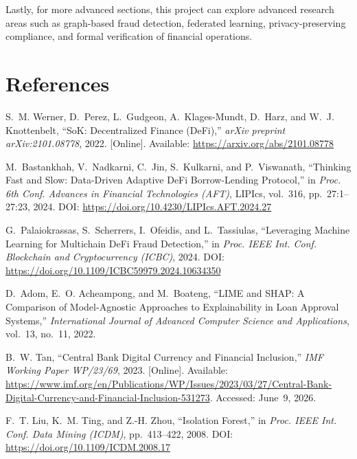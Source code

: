 \documentclass[12pt, a4paper]{report}
\begin{document}
Lastly, for more advanced sections, this project can explore advanced research areas such as graph-based fraud detection, federated learning, privacy-preserving compliance, and formal verification of financial operations.

\chapter*{References}
{}

{\small
\begin{enumerate}[label={[\arabic*]}]
\item S.~M. Werner, D.~Perez, L.~Gudgeon, A.~Klages-Mundt, D.~Harz, and W.~J. Knottenbelt, ``SoK: Decentralized Finance (DeFi),'' \textit{arXiv preprint arXiv:2101.08778}, 2022. [Online]. Available: \url{https://arxiv.org/abs/2101.08778}

\item M.~Bastankhah, V.~Nadkarni, C.~Jin, S.~Kulkarni, and P.~Viswanath, ``Thinking Fast and Slow: Data-Driven Adaptive DeFi Borrow-Lending Protocol,'' in \textit{Proc. 6th Conf. Advances in Financial Technologies (AFT)}, LIPIcs, vol.~316, pp.~27:1--27:23, 2024. DOI: \url{https://doi.org/10.4230/LIPIcs.AFT.2024.27}

\item G.~Palaiokrassas, S.~Scherrers, I.~Ofeidis, and L.~Tassiulas, ``Leveraging Machine Learning for Multichain DeFi Fraud Detection,'' in \textit{Proc. IEEE Int. Conf. Blockchain and Cryptocurrency (ICBC)}, 2024. DOI: \url{https://doi.org/10.1109/ICBC59979.2024.10634350}

\item D.~Adom, E.~O. Acheampong, and M.~Boateng, ``LIME and SHAP: A Comparison of Model-Agnostic Approaches to Explainability in Loan Approval Systems,'' \textit{International Journal of Advanced Computer Science and Applications}, vol.~13, no.~11, 2022.

\item B.~W. Tan, ``Central Bank Digital Currency and Financial Inclusion,'' \textit{IMF Working Paper WP/23/69}, 2023. [Online]. Available: \url{https://www.imf.org/en/Publications/WP/Issues/2023/03/27/Central-Bank-Digital-Currency-and-Financial-Inclusion-531273}. Accessed: June~9, 2026.

\item F.~T. Liu, K.~M. Ting, and Z.-H. Zhou, ``Isolation Forest,'' in \textit{Proc. IEEE Int. Conf. Data Mining (ICDM)}, pp.~413--422, 2008. DOI: \url{https://doi.org/10.1109/ICDM.2008.17}


\end{enumerate}}
\end{document}

